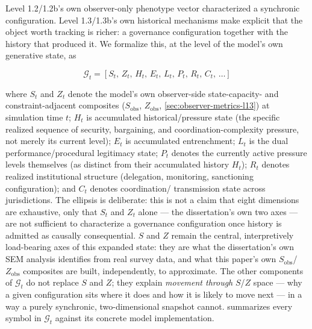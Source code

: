 Level 1.2/1.2b's own observer-only phenotype vector characterized a
synchronic configuration. Level 1.3/1.3b's own historical mechanisms make
explicit that the object worth tracking is richer: a governance
configuration together with the history that produced it. We formalize
this, at the level of the model's own generative state, as

\begin{equation}
\mathcal{G}_t = [S_t,\, Z_t,\, H_t,\, E_t,\, L_t,\, P_t,\, R_t,\, C_t,\, \ldots]
\label{eq:rich-state}
\end{equation}

where $S_t$ and $Z_t$ denote the model's own observer-side state-capacity-
and constraint-adjacent composites ($S_{\text{obs}}$, $Z_{\text{obs}}$,
\cref{sec:observer-metrics-l13}) at simulation time $t$; $H_t$ is
accumulated historical/pressure state (the specific realized sequence of
security, bargaining, and coordination-complexity pressure, not merely its
current level); $E_t$ is accumulated entrenchment; $L_t$ is the dual
performance/procedural legitimacy state; $P_t$ denotes the currently active
pressure levels themselves (as distinct from their accumulated history
$H_t$); $R_t$ denotes realized institutional structure (delegation,
monitoring, sanctioning configuration); and $C_t$ denotes coordination/
transmission state across jurisdictions. The ellipsis is deliberate: this
is not a claim that eight dimensions are exhaustive, only that $S_t$ and
$Z_t$ alone --- the dissertation's own two axes --- are not sufficient to
characterize a governance configuration once history is admitted as
causally consequential. $S$ and $Z$ remain the central, interpretively
load-bearing axes of this expanded state: they are what the dissertation's
own SEM analysis identifies from real survey data, and what this paper's
own $S_{\text{obs}}$/$Z_{\text{obs}}$ composites are built, independently,
to approximate. The other components of $\mathcal{G}_t$ do not replace $S$
and $Z$; they explain \textit{movement through} $S$/$Z$ space --- why a
given configuration sits where it does and how it is likely to move next
--- in a way a purely synchronic, two-dimensional snapshot cannot.
 summarizes every symbol in $\mathcal{G}_t$
against its concrete model implementation.

\begin{table}[htbp]
\centering
\caption{The expanded generative state $\mathcal{G}_t$: symbol, denotation, and model implementation.}
\label{tab:expanded-state}
\end{table}

